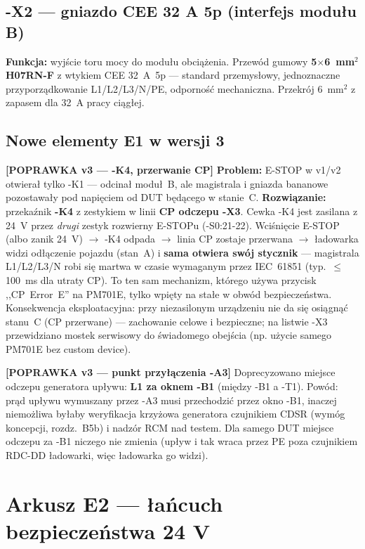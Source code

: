 \documentclass[11pt,a4paper]{article}
\newcommand{\popr}[1]{\textbf{\color{granat}[POPRAWKA v3 --- #1]}}
\begin{document}
\subsection{-X2 --- gniazdo CEE 32 A 5p (interfejs modułu B)}
\textbf{Funkcja:} wyjście toru mocy do modułu obciążenia. Przewód gumowy \textbf{5$\times$6~mm$^2$
H07RN-F} z wtykiem CEE 32~A~5p --- standard przemysłowy, jednoznaczne przyporządkowanie
L1/L2/L3/N/PE, odporność mechaniczna. Przekrój 6~mm$^2$ z zapasem dla 32~A pracy ciągłej.

\subsection{Nowe elementy E1 w wersji 3}
\label{sec:k4}
\popr{-K4, przerwanie CP} \textbf{Problem:} E-STOP w v1/v2 otwierał tylko -K1 --- odcinał moduł~B,
ale magistrala i gniazda bananowe pozostawały pod napięciem od DUT będącego w stanie~C.
\textbf{Rozwiązanie:} przekaźnik \textbf{-K4} z zestykiem w linii \textbf{CP odczepu -X3}.
Cewka -K4 jest zasilana z 24~V przez \emph{drugi} zestyk rozwierny E-STOPu (-S0:21-22).
Wciśnięcie E-STOP (albo zanik 24~V) $\to$ -K4 odpada $\to$ linia CP zostaje przerwana $\to$
ładowarka widzi odłączenie pojazdu (stan~A) i \textbf{sama otwiera swój stycznik} --- magistrala
L1/L2/L3/N robi się martwa w czasie wymaganym przez IEC~61851 (typ.\ $\le$100~ms dla utraty CP).
To ten sam mechanizm, którego używa przycisk ,,CP~Error~E'' na PM701E, tylko wpięty na stałe
w obwód bezpieczeństwa. Konsekwencja eksploatacyjna: przy niezasilonym urządzeniu nie da się
osiągnąć stanu~C (CP przerwane) --- zachowanie celowe i bezpieczne; na listwie -X3 przewidziano
mostek serwisowy do świadomego obejścia (np. użycie samego PM701E bez custom device).

\popr{punkt przyłączenia -A3} Doprecyzowano miejsce odczepu generatora upływu: \textbf{L1 za oknem
-B1} (między -B1 a -T1). Powód: prąd upływu wymuszany przez -A3 musi przechodzić przez okno -B1,
inaczej niemożliwa byłaby weryfikacja krzyżowa generatora czujnikiem CDSR (wymóg koncepcji,
rozdz.~B5b) i nadzór RCM nad testem. Dla samego DUT miejsce odczepu za -B1 niczego nie zmienia
(upływ i tak wraca przez PE poza czujnikiem RDC-DD ładowarki, więc ładowarka go widzi).

\section{Arkusz E2 --- łańcuch bezpieczeństwa 24 V}
\label{sec:e2}
\end{document}
